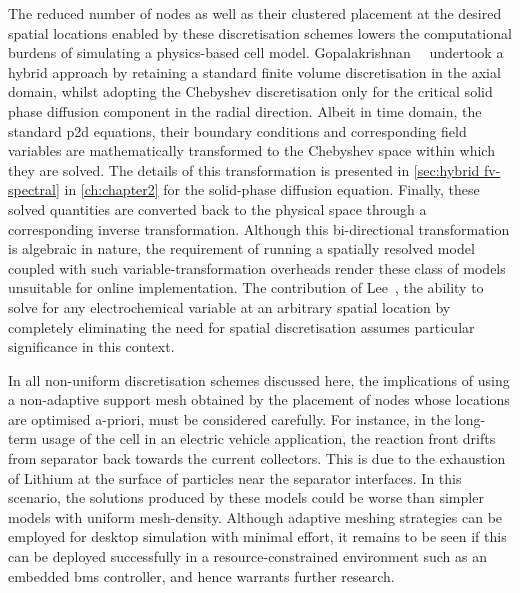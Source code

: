 The  reduced  number of  nodes  as  well as  their  clustered  placement at  the
desired  spatial  locations  enabled  by  these  discretisation  schemes  lowers
the   computational  burdens   of   simulating  a   physics-based  cell   model.
Gopalakrishnan~\etal{}~\cite{Gopalakrishnan2018} undertook a  hybrid approach by
retaining a  standard finite volume  discretisation in the axial  domain, whilst
adopting  the  Chebyshev  discretisation  only  for  the  critical  solid  phase
diffusion component in the radial direction. Albeit in time domain, the standard
\gls{p2d} equations, their boundary conditions and corresponding field variables
are  mathematically transformed  to the  Chebyshev space  within which  they are
solved.  The details  of this  transformation is  presented in  \cref{sec:hybrid
fv-spectral}  in  \cref{ch:chapter2}  for the  solid-phase  diffusion  equation.
Finally,  these solved  quantities  are  converted back  to  the physical  space
through  a corresponding  inverse transformation.  Although this  bi-directional
transformation is  algebraic in nature,  the requirement of running  a spatially
resolved model coupled with  such variable-transformation overheads render these
class  of  models unsuitable  for  online  implementation. The  contribution  of
Lee~\etal{}, \ie{} the  ability to solve for any electrochemical  variable at an
arbitrary  spatial  location by  completely  eliminating  the need  for  spatial
discretisation assumes particular significance in this context.


In all  non-uniform discretisation schemes  discussed here, the  implications of
using  a non-adaptive  support mesh  obtained by  the placement  of nodes  whose
locations are optimised a-priori, must be considered carefully. For instance, in
the long-term  usage of the cell  \eg{} in an electric  vehicle application, the
reaction front drifts  from separator back towards the  current collectors. This
is  due to  the exhaustion  of  Lithium at  the  surface of  particles near  the
separator  interfaces.  In  this  scenario,  the  solutions  produced  by  these
models could  be worse than  simpler models with uniform  mesh-density. Although
adaptive meshing strategies can be  employed for desktop simulation with minimal
effort,  it remains  to  be seen  if  this  can be  deployed  successfully in  a
resource-constrained environment  such as an embedded  \gls{bms} controller, and
hence warrants  further research.


